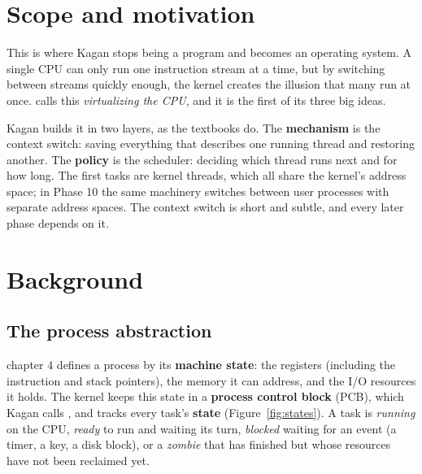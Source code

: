 \documentclass[11pt,a4paper]{article}
\begin{document}


\section{Scope and motivation}

This is where Kagan stops being a program and becomes an operating system. A single CPU can only run one
instruction stream at a time, but by switching between streams quickly enough, the kernel creates the illusion that
many run at once. \OSTEP calls this \emph{virtualizing the CPU}, and it is the first of its three big ideas.

Kagan builds it in two layers, as the textbooks do. The \textbf{mechanism} is the context switch: saving everything
that describes one running thread and restoring another. The \textbf{policy} is the scheduler: deciding which thread
runs next and for how long. The first tasks are kernel threads, which all share the kernel's address space; in Phase 10
the same machinery switches between user processes with separate address spaces. The context switch is short and
subtle, and every later phase depends on it.

\section{Background}

\subsection{The process abstraction}

\OSTEP chapter 4 defines a process by its \textbf{machine state}: the registers (including the instruction and stack
pointers), the memory it can address, and the I/O resources it holds. The kernel keeps this state in a
\textbf{process control block} (PCB), which Kagan calls , and tracks every task's
\textbf{state} (Figure~\ref{fig:states}). A task is \emph{running} on the CPU, \emph{ready} to run and waiting its turn,
\emph{blocked} waiting for an event (a timer, a key, a disk block), or a \emph{zombie} that has finished but whose
resources have not been reclaimed yet.
\end{document}

